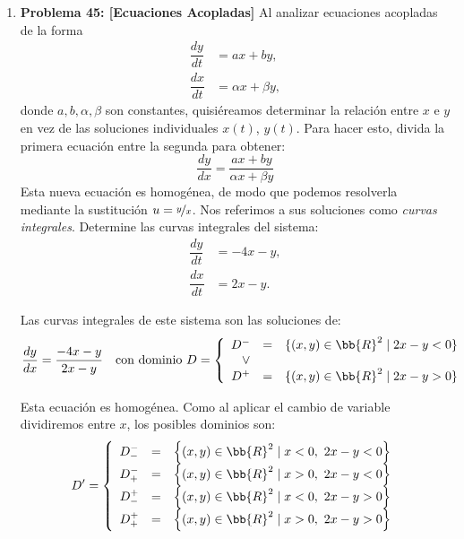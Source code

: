 \begin{ejercicio}
\begin{enumerate}
        \item \textbf{Problema 45: [Ecuaciones Acopladas]} Al analizar ecuaciones acopladas de la forma
        \begin{align*}
            \dfrac{dy}{dt} &= ax+by,\\
            \dfrac{dx}{dt} &= \alpha x+\beta y,
        \end{align*} 
        donde $a,b,\alpha,\beta$ son constantes, quisiéreamos determinar la relación entre $x$ e $y$ en vez de las soluciones individuales $x(t)$, $y(t)$. Para hacer esto, divida la primera ecuación entre la segunda para obtener:
        \begin{equation*}
            \dfrac{dy}{dx} = \dfrac{ax+by}{\alpha x+\beta y}
        \end{equation*}
        Esta nueva ecuación es homogénea, de modo que podemos resolverla mediante la sustitución $u=\nicefrac{y}{x}$. Nos referimos a sus soluciones como \emph{curvas integrales}. Determine las curvas integrales del sistema:
        \begin{align*}
            \dfrac{dy}{dt} &= -4x-y,\\
            \dfrac{dx}{dt} &= 2x-y.
        \end{align*}
        
        Las curvas integrales de este sistema son las soluciones de:
        \begin{equation*}
            \dfrac{dy}{dx} = \dfrac{-4x-y}{2x-y} \quad \text{con dominio } D=\left\{\begin{array}{rcl}D^-&=&\{(x,y)\in \bb{R}^2 \mid 2x-y<0\}\\ \lor\\
            D^+&=&\{(x,y)\in \bb{R}^2 \mid 2x-y>0\}
        \end{array}\right.
        \end{equation*}

        Esta ecuación es homogénea. Como al aplicar el cambio de variable dividiremos entre $x$, los posibles dominios son:
        \begin{equation*}
            D'=\left\{
                \begin{array}{rcl}      
                    D^-_- &=& \left\{(x,y)\in \bb{R}^2 \mid x<0,~2x-y<0\right\}\\
                    D^-_+ &=& \left\{(x,y)\in \bb{R}^2 \mid x>0,~2x-y<0\right\}\\
                    D^+_- &=& \left\{(x,y)\in \bb{R}^2 \mid x<0,~2x-y>0\right\}\\
                    D^+_+ &=& \left\{(x,y)\in \bb{R}^2 \mid x>0,~2x-y>0\right\}
                \end{array}
            \right.
        \end{equation*}


\end{enumerate}
\end{ejercicio}
